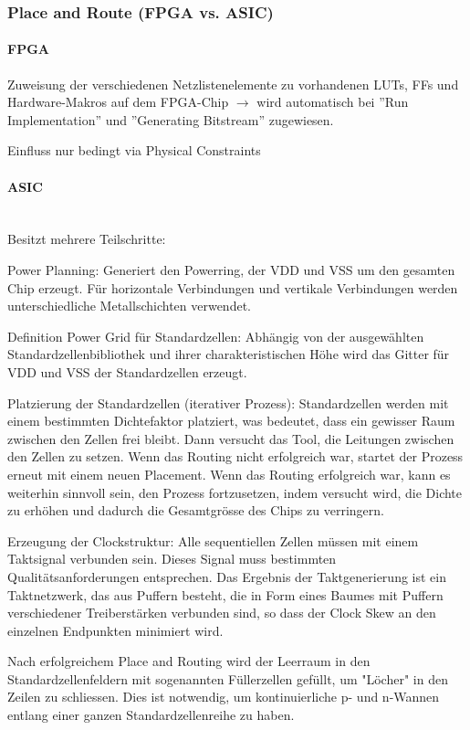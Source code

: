 \subsubsection{Place and Route (FPGA vs. ASIC)}
\paragraph{FPGA}
\begin{compactitem}
        \item Zuweisung der verschiedenen Netzlistenelemente zu vorhandenen LUTs, FFs und Hardware-Makros auf dem FPGA-Chip $\rightarrow$ wird automatisch bei ''Run Implementation'' und ''Generating Bitstream'' zugewiesen.
        \item Einfluss nur bedingt via Physical Constraints
\end{compactitem}
\paragraph{ASIC}$~$ \\
Besitzt mehrere Teilschritte:
\begin{compactitem}
        \item Power Planning: Generiert den Powerring, der VDD und VSS um den gesamten Chip erzeugt. Für horizontale Verbindungen und vertikale Verbindungen werden unterschiedliche Metallschichten verwendet.
        \item Definition Power Grid für Standardzellen: Abhängig von der ausgewählten Standardzellenbibliothek und ihrer charakteristischen Höhe wird das Gitter für VDD und VSS der Standardzellen erzeugt.
        \item Platzierung der Standardzellen (iterativer Prozess): Standardzellen werden mit einem bestimmten Dichtefaktor platziert, was bedeutet, dass ein gewisser Raum zwischen den Zellen frei bleibt. Dann versucht das Tool, die Leitungen zwischen den Zellen zu setzen. Wenn das Routing nicht erfolgreich war, startet der Prozess erneut mit einem neuen Placement. Wenn das Routing erfolgreich war, kann es weiterhin sinnvoll sein, den Prozess fortzusetzen, indem versucht wird, die Dichte zu erhöhen und dadurch die Gesamtgrösse des Chips zu verringern.
        \item Erzeugung der Clockstruktur: Alle sequentiellen Zellen müssen mit einem Taktsignal verbunden sein. Dieses Signal muss bestimmten Qualitätsanforderungen entsprechen. Das Ergebnis der Taktgenerierung ist ein Taktnetzwerk, das aus Puffern besteht, die in Form eines Baumes mit Puffern verschiedener Treiberstärken verbunden sind, so dass der Clock Skew an den einzelnen Endpunkten minimiert wird.
        \item Nach erfolgreichem Place and Routing wird der Leerraum in den Standardzellenfeldern mit sogenannten Füllerzellen gefüllt, um "Löcher" in den Zeilen zu schliessen. Dies ist notwendig, um kontinuierliche p- und n-Wannen entlang einer ganzen Standardzellenreihe zu haben.
\end{compactitem}
